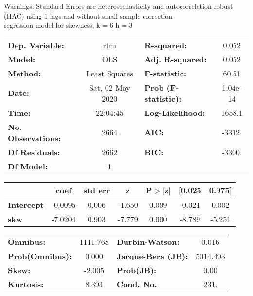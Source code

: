 Warnings: \newline
 [1] Standard Errors are heteroscedasticity and autocorrelation robust (HAC) using 1 lags and without small sample correction\\ 

regression model for skewness, k = 6 h = 3\begin{center}
\begin{tabular}{lclc}
\toprule
\textbf{Dep. Variable:}    &       rtrn       & \textbf{  R-squared:         } &     0.052   \\
\textbf{Model:}            &       OLS        & \textbf{  Adj. R-squared:    } &     0.052   \\
\textbf{Method:}           &  Least Squares   & \textbf{  F-statistic:       } &     60.51   \\
\textbf{Date:}             & Sat, 02 May 2020 & \textbf{  Prob (F-statistic):} &  1.04e-14   \\
\textbf{Time:}             &     22:04:45     & \textbf{  Log-Likelihood:    } &    1658.1   \\
\textbf{No. Observations:} &        2664      & \textbf{  AIC:               } &    -3312.   \\
\textbf{Df Residuals:}     &        2662      & \textbf{  BIC:               } &    -3300.   \\
\textbf{Df Model:}         &           1      & \textbf{                     } &             \\
\bottomrule
\end{tabular}
\begin{tabular}{lcccccc}
                   & \textbf{coef} & \textbf{std err} & \textbf{z} & \textbf{P$> |$z$|$} & \textbf{[0.025} & \textbf{0.975]}  \\
\midrule
\textbf{Intercept} &      -0.0095  &        0.006     &    -1.650  &         0.099        &       -0.021    &        0.002     \\
\textbf{skw}       &      -7.0204  &        0.903     &    -7.779  &         0.000        &       -8.789    &       -5.251     \\
\bottomrule
\end{tabular}
\begin{tabular}{lclc}
\textbf{Omnibus:}       & 1111.768 & \textbf{  Durbin-Watson:     } &    0.016  \\
\textbf{Prob(Omnibus):} &   0.000  & \textbf{  Jarque-Bera (JB):  } & 5014.493  \\
\textbf{Skew:}          &  -2.005  & \textbf{  Prob(JB):          } &     0.00  \\
\textbf{Kurtosis:}      &   8.394  & \textbf{  Cond. No.          } &     231.  \\
\bottomrule
\end{tabular}
\end{center}


